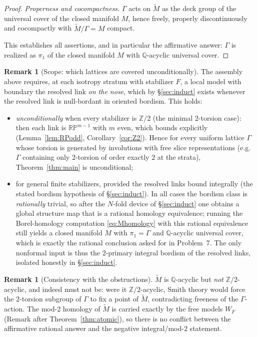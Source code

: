 \documentclass[12pt]{article}
\theoremstyle{definition}
\newtheorem{remark}[theorem]{Remark}
\begin{document}
\begin{proof}
\emph{Properness and cocompactness.} $\Gamma$ acts on $\widetilde M$ as the deck
group of the universal cover of the closed manifold $M$, hence freely, properly
discontinuously and cocompactly with $\widetilde M/\Gamma=M$ compact.

This establishes all assertions, and in particular the affirmative answer:
$\Gamma$ is realized as $\pi_1$ of the closed manifold $M$ with
$\mathbb{Q}$-acyclic universal cover.
\end{proof}

\begin{remark}[Scope: which lattices are covered unconditionally]\label{rem:scope}
The assembly above requires, at each isotropy stratum with stabilizer $F$, a
local model with boundary the resolved link \emph{on the nose}, which by
\S\ref{sec:induct} exists whenever the resolved link is null-bordant in oriented
bordism. This holds:
\begin{itemize}
\item \emph{unconditionally} when every stabilizer is $\mathbb{Z}/2$ (the minimal
$2$-torsion case): then each link is $\mathbb{RP}^{m-1}$ with $m$ even, which
bounds explicitly (Lemma~\ref{lem:RPodd}, Corollary~\ref{cor:Z2}). Hence for
every uniform lattice $\Gamma$ whose torsion is generated by involutions with
free slice representations (e.g.\ $\Gamma$ containing only $2$-torsion of order
exactly $2$ at the strata), Theorem~\ref{thm:main} is unconditional;
\item for general finite stabilizers, provided the resolved links bound
integrally (the stated bordism hypothesis of \S\ref{sec:induct}). In all cases
the bordism class is \emph{rationally} trivial, so after the $N$-fold device of
\S\ref{sec:induct} one obtains a global structure map that is a rational homology
equivalence; running the Borel-homology computation \eqref{eq:Mhomology} with this
rational equivalence still yields a closed manifold $M$ with $\pi_1=\Gamma$ and
$\mathbb{Q}$-acyclic universal cover, which is exactly the rational conclusion
asked for in Problem~7. The only nonformal input is thus the $2$-primary integral
bordism of the resolved links, isolated honestly in \S\ref{sec:induct}.
\end{itemize}
\end{remark}

\begin{remark}[Consistency with the obstructions]
$\widetilde M$ is $\mathbb{Q}$-acyclic but \emph{not} $\mathbb{Z}/2$-acyclic, and
indeed must not be: were it $\mathbb{Z}/2$-acyclic, Smith theory would force the
$2$-torsion subgroup of $\Gamma$ to fix a point of $\widetilde M$, contradicting
freeness of the $\Gamma$-action. The mod-$2$ homology of $\widetilde M$ is carried
exactly by the free models $W_F$ (Remark after Theorem~\ref{thm:atomic}), so
there is no conflict between the affirmative rational answer and the negative
integral/mod-$2$ statement.
\end{remark}
\end{document}
